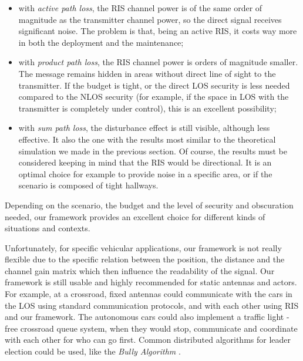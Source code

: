 \begin{itemize}
  \item with \textit{active path loss}, the RIS channel power is of the same order of magnitude as the transmitter channel power, so the direct signal receives significant noise. The problem is that, being an active RIS, it costs way more in both the deployment and the maintenance;
  \item with \textit{product path loss}, the RIS channel power is orders of magnitude smaller. The message remains hidden in areas without direct line of sight to the transmitter. If the budget is tight, or the direct LOS security is less needed compared to the NLOS security (for example, if the space in LOS with the transmitter is completely under control), this is an excellent possibility;
  \item with \textit{sum path loss}, the disturbance effect is still visible, although less effective. It also the one with the results most similar to the theoretical simulation we made in the previous section. Of course, the results must be considered keeping in mind that the RIS would be directional. It is an optimal choice for example to provide noise in a specific area, or if the scenario is composed of tight hallways.
\end{itemize}

Depending on the scenario, the budget and the level of security and obscuration needed, our framework provides an excellent choice for different kinds of situations and contexts.

Unfortunately, for specific vehicular applications, our framework is not really flexible due to the specific relation between the position, the distance and the channel gain matrix which then influence the readability of the signal. Our framework is still usable and highly recommended for static antennas and actors. For example, at a crossroad, fixed antennas could communicate with the cars in the LOS using standard communication protocols, and with each other using RIS and our framework. The autonomous cars could also implement a traffic light - free crossroad queue system, when they would stop, communicate and coordinate with each other for who can go first. Common distributed algorithms for leader election could be used, like the \textit{Bully Algorithm} \cite{Bully_algorithm}.

